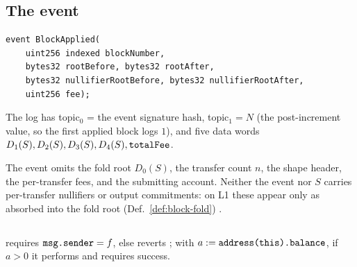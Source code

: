 \subsection{The  event}
\label{subsec:pool-event}

\begin{definition}[Event]
\label{def:pool-event}
\mbox{}\par\nobreak
\begin{Verbatim}[fontsize=\small]
event BlockApplied(
    uint256 indexed blockNumber,
    bytes32 rootBefore, bytes32 rootAfter,
    bytes32 nullifierRootBefore, bytes32 nullifierRootAfter,
    uint256 fee);
\end{Verbatim}
The log has topic$_0$ = the event signature hash, topic$_1 = N$ (the
post-increment value, so the first applied block logs $1$), and five data
words $D_1(S), D_2(S), D_3(S), D_4(S), \texttt{totalFee}$.
\end{definition}

\begin{property}
\label{prop:pool-event-content}
The event omits the fold root $D_0(S)$, the transfer count $n$, the shape
header, the per-transfer fees, and the submitting account. Neither the event
nor $S$ carries per-transfer nullifiers or output commitments: on L1 these
appear only as absorbed into the fold root (Def.~\ref{def:block-fold})
.
\end{property}

\subsection{}
\label{subsec:pool-fees}

\begin{definition}
\label{def:withdraw-fees}
 requires $\texttt{msg.sender} = f$, else reverts
; with $a := \texttt{address(this).balance}$, if $a>0$ it
performs  and requires success.
\end{definition}

